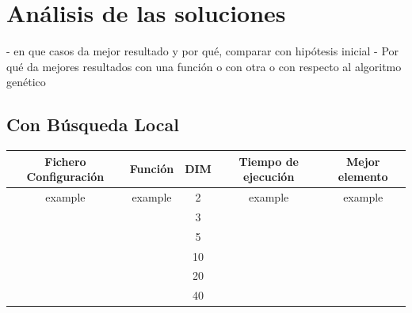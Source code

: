 \section{Análisis de las soluciones}

- en que casos da mejor resultado y por qué, comparar con hipótesis inicial
- Por qué da mejores resultados con una función o con otra o con respecto al algoritmo genético

\subsection{Con Búsqueda Local}

\begin{tabular}{||c|c|c|c|c||}
    \hline
    \textbf{Fichero Configuración} & \textbf{Función} & \textbf{DIM} & \textbf{Tiempo de ejecución} & \textbf{Mejor elemento} \\ \hline
    example                                     & example          & 2      & example                      & example                 \\ \hline
                                                &                  & 3             &                              &                         \\ \hline
                                                &                  & 5             &                              &                         \\ \hline
                                                &                  & 10             &                              &                         \\ \hline
                                                &                  & 20             &                              &                         \\ \hline
                                                &                  & 40             &                              &                         \\ \hline

\end{tabular}

